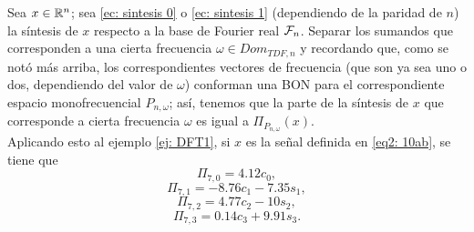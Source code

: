 \begin{nota}
Sea $x \in \mathbb{R}^{n}$; sea 
\eqref{ec: sintesis 0} o 
\eqref{ec: sintesis 1}
(dependiendo de la paridad de $n$)
la síntesis de $x$ respecto a la base de Fourier
real $\mathcal{F}_{n}$. 
Separar los sumandos que corresponden a una
cierta frecuencia $\omega \in Dom_{TDF, n}$ y recordando
que, como se notó más arriba, los correspondientes vectores
de frecuencia (que son ya sea uno o dos, dependiendo del valor
de $\omega$) conforman una BON para el correspondiente
espacio monofrecuencial 
$P_{n, \omega}$; así, tenemos que la parte de la 
síntesis de $x$ que corresponde a 
cierta frecuencia $\omega$ es igual a
$\Pi_{P_{n, \omega}}(x)$. \\

Aplicando esto al ejemplo \ref{ej: DFT1},
si $x$ es la señal definida en 
\ref{eq2: 10ab}, se tiene que
\[
\Pi_{7, 0} = 4.12 c_{0}, 
\]
\[
\Pi_{7, 1} = -8.76 c_{1} - 7.35 s_{1}, 
\]
\[
\Pi_{7, 2} = 4.77 c_{2} - 10 s_{2}, 
\]
\[
\Pi_{7, 3} = 0.14 c_{3} + 9.91 s_{3}.
\]
\end{nota}




